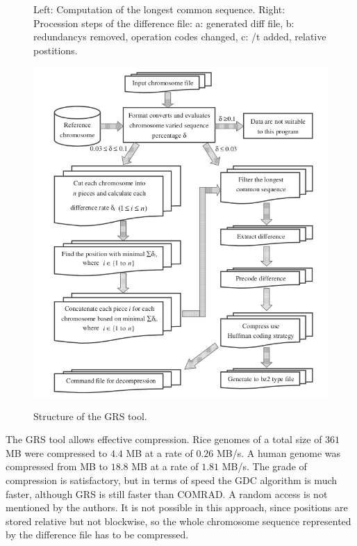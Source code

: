 \documentclass[acmtocl,acmnow]{article}
\begin{document}
\begin{figure}
\begin{minipage}{5cm}
\begin{center}
    \end{center}
\end{minipage}
\label{ComSubProc}
\caption{Left: Computation of the longest common sequence. Right: Procession steps of the difference file: a: generated 
          diff file, b: redundancys removed, operation codes changed, c: /t added, relative postitions. \cite{WaZh}}
\end{figure}

\begin{figure}
  \begin{center}
    \includegraphics[width=\textwidth]{img/WaZh.png}
    \label{WaZhStructure}
    \caption{Structure of the GRS tool. \cite{WaZh}}
  \end{center}
\end{figure}

The GRS tool allows effective compression. Rice genomes of a total size of $361$ MB were compressed to $4.4$ MB at a
rate of $0.26$ MB/s. A human genome was compressed from  MB to $18.8$ MB at a rate of $1.81$ MB/s. 
The grade of compression is satisfactory, but in terms of speed the GDC algorithm is much faster, although GRS is still
faster than COMRAD. A random access is not mentioned by the authors. It is not possible in this approach, since positions
are stored relative but not blockwise, so the whole chromosome sequence represented by the difference file has to be
compressed.
\end{document}
